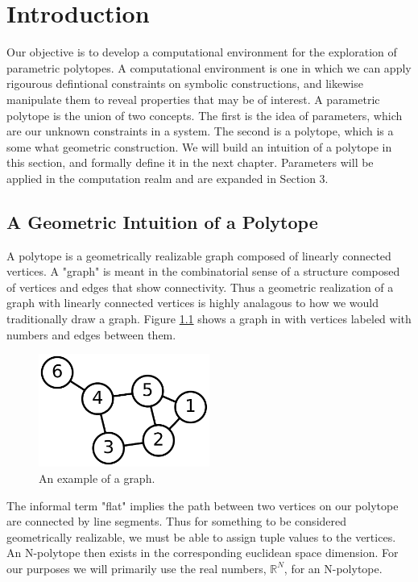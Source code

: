 \chapter{Introduction}

Our objective is to develop a computational environment for the exploration
of parametric polytopes. A computational environment is one in which
we can apply rigourous defintional constraints on symbolic constructions, and
likewise manipulate them to reveal properties that may be of interest.
A parametric polytope is the union of two concepts. The first is the idea
of parameters, which are our unknown constraints in a system. The second
is a polytope, which is a some what geometric construction. We will
build an intuition of a polytope in this section, and formally define it
in the next chapter. Parameters will be applied in the computation realm
and are expanded in Section 3.


\section{A Geometric Intuition of a Polytope}

A polytope is a geometrically realizable graph composed
of linearly connected vertices.\cite{9780486614809} 
A "graph" is meant in the combinatorial sense of a structure composed of
vertices and edges that show connectivity. Thus a geometric realization
of a graph with linearly connected vertices is highly analagous to how we would traditionally
draw a graph. Figure \ref{fig:graph} shows a graph in with vertices labeled
with numbers and edges between them.

\begin{figure}[h!]
  \centering
    \includegraphics[width=0.5\textwidth]{img/6graph.png}
  \caption{An example of a graph.}
  \label{fig:graph}
\end{figure}

The informal term "flat" implies the path between two vertices
on our polytope are connected by line segments. Thus for something to be
considered geometrically realizable, we must be able to assign tuple values
to the vertices. An N-polytope then exists in the corresponding euclidean
space dimension. For our purposes we will primarily use the real numbers,
$\mathbb{R}^N$, for an N-polytope.

